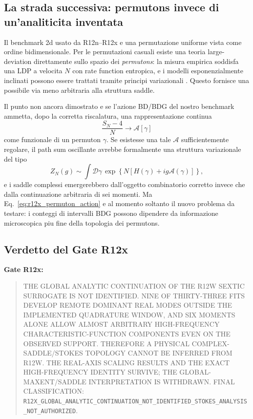 \documentclass[11pt,a4paper]{article}
\newcommand{\status}[1]{\textsf{#1}}
\begin{document}
\subsection{La strada successiva: permutons invece di un'analiticita inventata}

Il benchmark 2d usato da R12n--R12x e una permutazione uniforme vista come ordine bidimensionale. Per le permutazioni casuali esiste una teoria large-deviation direttamente sullo spazio dei \emph{permutons}: la misura empirica soddisfa una LDP a velocita $N$ con rate function entropica, e i modelli esponenzialmente inclinati possono essere trattati tramite principi variazionali \cite{BorgaEtAl2024,KenyonEtAl2020}. Questo fornisce una possibile via meno arbitraria alla struttura saddle.

Il punto non ancora dimostrato e se l'azione BD/BDG del nostro benchmark ammetta, dopo la corretta riscalatura, una rappresentazione continua
\begin{equation}
 \frac{S_N-4}{N}\longrightarrow \mathcal A[\gamma]
 \label{eq:r12x_permuton_action}
\end{equation}
come funzionale di un permuton $\gamma$. Se esistesse una tale $\mathcal A$ sufficientemente regolare, il path sum oscillante avrebbe formalmente una struttura variazionale del tipo
\begin{equation}
 Z_N(g)\sim\int \mathcal D\gamma\,
 \exp\left\{N\left[H(\gamma)+ig\mathcal A(\gamma)\right]\right\},
 \label{eq:r12x_permuton_saddle}
\end{equation}
e i saddle complessi emergerebbero dall'oggetto combinatorio corretto invece che dalla continuazione arbitraria di sei momenti. Ma Eq.~\eqref{eq:r12x_permuton_action} e al momento soltanto il nuovo problema da testare: i conteggi di intervalli BDG possono dipendere da informazione microscopica piu fine della topologia dei permutons.

\subsection{Verdetto del Gate R12x}

\textbf{Gate R12x:}
\begin{quote}
\status{THE GLOBAL ANALYTIC CONTINUATION OF THE R12W SEXTIC SURROGATE IS NOT IDENTIFIED. NINE OF THIRTY-THREE FITS DEVELOP REMOTE DOMINANT REAL MODES OUTSIDE THE IMPLEMENTED QUADRATURE WINDOW, AND SIX MOMENTS ALONE ALLOW ALMOST ARBITRARY HIGH-FREQUENCY CHARACTERISTIC-FUNCTION COMPONENTS EVEN ON THE OBSERVED SUPPORT. THEREFORE A PHYSICAL COMPLEX-SADDLE/STOKES TOPOLOGY CANNOT BE INFERRED FROM R12W. THE REAL-AXIS SCALING RESULTS AND THE EXACT HIGH-FREQUENCY IDENTITY SURVIVE; THE GLOBAL-MAXENT/SADDLE INTERPRETATION IS WITHDRAWN. FINAL CLASSIFICATION:} \nolinkurl{R12X_GLOBAL_ANALYTIC_CONTINUATION_NOT_IDENTIFIED_STOKES_ANALYSIS_NOT_AUTHORIZED}.
\end{quote}
\end{document}
